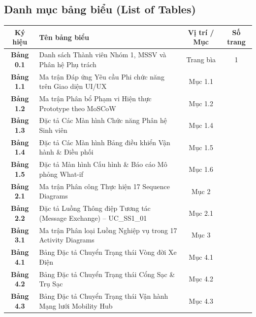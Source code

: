 \documentclass[12pt,a4paper]{article}
\begin{document}
\subsection*{Danh mục bảng biểu (List of Tables)}
\begin{center}
\renewcommand{\arraystretch}{1.2}
\small
\begin{tabularx}{\textwidth}{|c|X|c|c|}
    \hline
    \textbf{Ký hiệu} & \textbf{Tên bảng biểu} & \textbf{Vị trí / Mục} & \textbf{Số trang} \\
    \hline
    \textbf{Bảng 0.1} & Danh sách Thành viên Nhóm 1, MSSV và Phân hệ Phụ trách & Trang bìa & 1 \\
    \hline
    \textbf{Bảng 1.1} & Ma trận Đáp ứng Yêu cầu Phi chức năng trên Giao diện UI/UX & Mục 1.1 & \pageref{tab:ui-nfr-matrix} \\
    \hline
    \textbf{Bảng 1.2} & Ma trận Phân bổ Phạm vi Hiện thực Prototype theo MoSCoW & Mục 1.2 & \pageref{tab:moscow-scope} \\
    \hline
    \textbf{Bảng 1.3} & Đặc tả Các Màn hình Chức năng Phân hệ Sinh viên & Mục 1.4 & \pageref{tab:ui-student-screens} \\
    \hline
    \textbf{Bảng 1.4} & Đặc tả Các Màn hình Bảng điều khiển Vận hành \& Điều phối & Mục 1.5 & \pageref{tab:ui-operator-screens} \\
    \hline
    \textbf{Bảng 1.5} & Đặc tả Màn hình Cấu hình \& Báo cáo Mô phỏng What-if & Mục 1.6 & \pageref{tab:ui-whatif-screens} \\
    \hline
    \textbf{Bảng 2.1} & Ma trận Phân công Thực hiện 17 Sequence Diagrams & Mục 2 & \pageref{tab:seq-assignment} \\
    \hline
    \textbf{Bảng 2.2} & Đặc tả Luồng Thông điệp Tương tác (Message Exchange) -- UC\_SS1\_01 & Mục 2.1 & \pageref{tab:msg-ss1-01} \\
    \hline
    \textbf{Bảng 3.1} & Ma trận Phân loại Luồng Nghiệp vụ trong 17 Activity Diagrams & Mục 3 & \pageref{tab:act-matrix} \\
    \hline
    \textbf{Bảng 4.1} & Bảng Đặc tả Chuyển Trạng thái Vòng đời Xe Điện & Mục 4.1 & \pageref{tab:state-ev-spec} \\
    \hline
    \textbf{Bảng 4.2} & Bảng Đặc tả Chuyển Trạng thái Cổng Sạc \& Trụ Sạc & Mục 4.2 & \pageref{tab:state-charger-spec} \\
    \hline
    \textbf{Bảng 4.3} & Bảng Đặc tả Chuyển Trạng thái Vận hành Mạng lưới Mobility Hub & Mục 4.3 & \pageref{tab:state-hub-spec} \\
    \hline
\end{tabularx}
\end{center}
\vspace*{\fill}
\newpage
\end{document}
